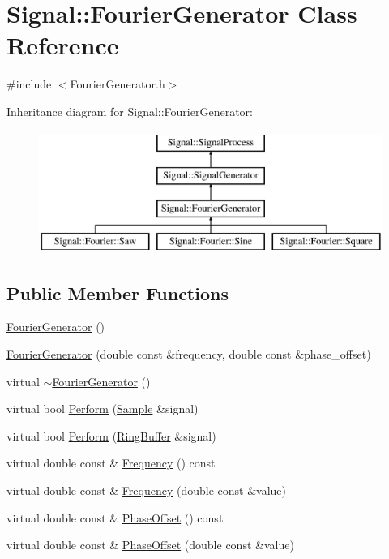 \hypertarget{classSignal_1_1FourierGenerator}{\section{Signal\+:\+:Fourier\+Generator Class Reference}
\label{classSignal_1_1FourierGenerator}
}


{\ttfamily \#include $<$Fourier\+Generator.\+h$>$}

Inheritance diagram for Signal\+:\+:Fourier\+Generator\+:\begin{figure}[H]
\begin{center}
\leavevmode
\includegraphics[height=4.000000cm]{classSignal_1_1FourierGenerator}
\end{center}
\end{figure}
\subsection*{Public Member Functions}
\begin{DoxyCompactItemize}
\item 
\hyperlink{classSignal_1_1FourierGenerator_a9e79a002b55ffc9c63d9b17598bafa39}{Fourier\+Generator} ()
\item 
\hyperlink{classSignal_1_1FourierGenerator_a2b8b65f7ceba17405052372c49f207e8}{Fourier\+Generator} (double const \&frequency, double const \&phase\+\_\+offset)
\item 
virtual \hyperlink{classSignal_1_1FourierGenerator_a71331b24541b80aba380be166dd3d996}{$\sim$\+Fourier\+Generator} ()
\item 
virtual bool \hyperlink{classSignal_1_1FourierGenerator_afb605299301a6912c65f960a70423bf5}{Perform} (\hyperlink{classSignal_1_1Sample}{Sample} \&signal)
\item 
virtual bool \hyperlink{classSignal_1_1FourierGenerator_a9a03e0061dad4018d822284d3af9423a}{Perform} (\hyperlink{classSignal_1_1RingBuffer}{Ring\+Buffer} \&signal)
\item 
virtual double const \& \hyperlink{classSignal_1_1SignalGenerator_a96af42ee68f94e9b04d034fd68b73ecd}{Frequency} () const 
\item 
virtual double const \& \hyperlink{classSignal_1_1SignalGenerator_af83b532bf3ddc3637c2fd7a1dfd095cb}{Frequency} (double const \&value)
\item 
virtual double const \& \hyperlink{classSignal_1_1SignalGenerator_ac2538ec946f001e394d2416fda698d1c}{Phase\+Offset} () const 
\item 
virtual double const \& \hyperlink{classSignal_1_1SignalGenerator_ac6a103ff72beaa338f6d18c812522d78}{Phase\+Offset} (double const \&value)
\end{DoxyCompactItemize}

